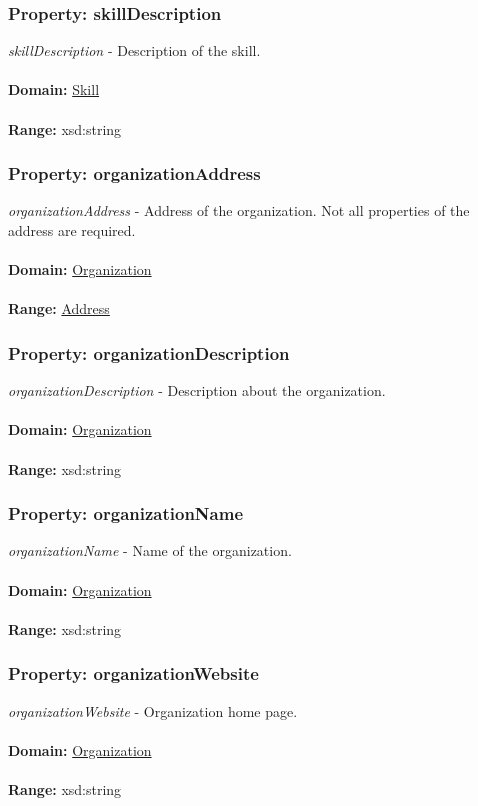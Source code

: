 \documentclass[a4paper,12pt]{article}
\numberwithin{equation}{section}
\begin{document}
\subsubsection{Property: skillDescription}\hypertarget{skillDescription}{}
\textit{skillDescription} - Description of the skill.
\\\\
\textbf{Domain:} \hyperlink{Skill}{Skill} 
\\\\
\textbf{Range:}   xsd:string

\subsubsection{Property: organizationAddress}\hypertarget{organizationAddress}{}
\textit{organizationAddress} - Address of the organization. Not all properties of the address are required.
\\\\
\textbf{Domain:} \hyperlink{Organization}{Organization} 
\\\\
\textbf{Range:}   \hyperlink{Address}{Address} 

\subsubsection{Property: organizationDescription}\hypertarget{organizationDescription}{}
\textit{organizationDescription} - Description about the organization.
\\\\
\textbf{Domain:} \hyperlink{Organization}{Organization} 
\\\\
\textbf{Range:}   xsd:string

\subsubsection{Property: organizationName}\hypertarget{organizationName}{}
\textit{organizationName} - Name of the organization.
\\\\
\textbf{Domain:} \hyperlink{Organization}{Organization} 
\\\\
\textbf{Range:}   xsd:string

\subsubsection{Property: organizationWebsite}\hypertarget{organizationWebsite}{}
\textit{organizationWebsite} - Organization home page.
\\\\
\textbf{Domain:} \hyperlink{Organization}{Organization} 
\\\\
\textbf{Range:}   xsd:string
\end{document}
